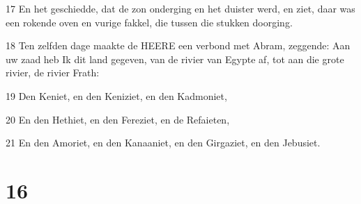 \par 17 En het geschiedde, dat de zon onderging en het duister werd, en ziet, daar was een rokende oven en vurige fakkel, die tussen die stukken doorging.
\par 18 Ten zelfden dage maakte de HEERE een verbond met Abram, zeggende: Aan uw zaad heb Ik dit land gegeven, van de rivier van Egypte af, tot aan die grote rivier, de rivier Frath:
\par 19 Den Keniet, en den Keniziet, en den Kadmoniet,
\par 20 En den Hethiet, en den Fereziet, en de Refaieten,
\par 21 En den Amoriet, en den Kanaaniet, en den Girgaziet, en den Jebusiet.

\chapter{16}

